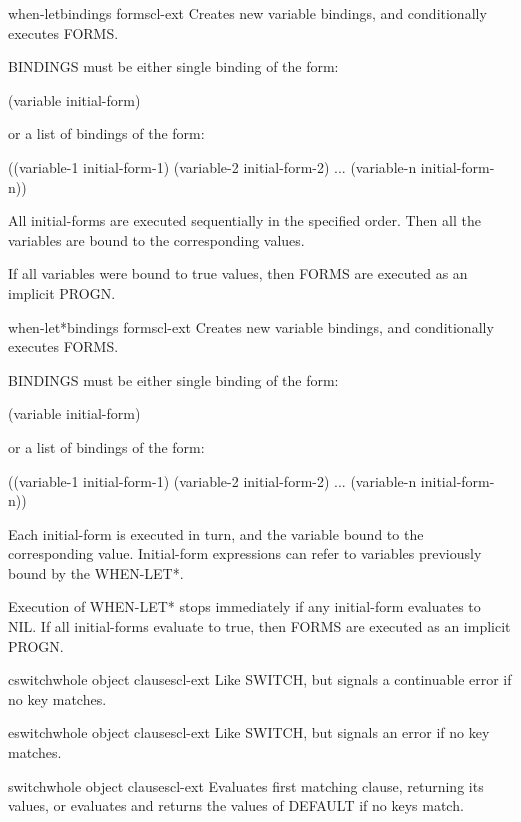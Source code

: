 \begin{macro}{when-let}{bindings \body forms}{cl-ext}{}
  Creates new variable bindings, and conditionally executes FORMS.

BINDINGS must be either single binding of the form:

 (variable initial-form)

or a list of bindings of the form:

 ((variable-1 initial-form-1)
  (variable-2 initial-form-2)
  ...
  (variable-n initial-form-n))

All initial-forms are executed sequentially in the specified order. Then all
the variables are bound to the corresponding values.

If all variables were bound to true values, then FORMS are executed as an
implicit PROGN.
\end{macro}

\begin{macro}{when-let*}{bindings \body forms}{cl-ext}{}
  Creates new variable bindings, and conditionally executes FORMS.

BINDINGS must be either single binding of the form:

 (variable initial-form)

or a list of bindings of the form:

 ((variable-1 initial-form-1)
  (variable-2 initial-form-2)
  ...
  (variable-n initial-form-n))

Each initial-form is executed in turn, and the variable bound to the
corresponding value. Initial-form expressions can refer to variables
previously bound by the WHEN-LET*.

Execution of WHEN-LET* stops immediately if any initial-form evaluates to NIL.
If all initial-forms evaluate to true, then FORMS are executed as an implicit
PROGN.
\end{macro}

\begin{macro}{cswitch}{\whole whole object \body clauses}{cl-ext}{}
  Like SWITCH, but signals a continuable error if no key matches.
\end{macro}

\begin{macro}{eswitch}{\whole whole object \body clauses}{cl-ext}{}
  Like SWITCH, but signals an error if no key matches.
\end{macro}

\begin{macro}{switch}{\whole whole object \body clauses}{cl-ext}{}
  Evaluates first matching clause, returning its values, or evaluates and
returns the values of DEFAULT if no keys match.
\end{macro}

